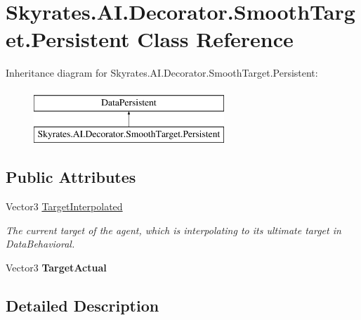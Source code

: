 \hypertarget{class_skyrates_1_1_a_i_1_1_decorator_1_1_smooth_target_1_1_persistent}{\section{Skyrates.\-A\-I.\-Decorator.\-Smooth\-Target.\-Persistent Class Reference}
\label{class_skyrates_1_1_a_i_1_1_decorator_1_1_smooth_target_1_1_persistent}
}


 


Inheritance diagram for Skyrates.\-A\-I.\-Decorator.\-Smooth\-Target.\-Persistent\-:\begin{figure}[H]
\begin{center}
\leavevmode
\includegraphics[height=2.000000cm]{class_skyrates_1_1_a_i_1_1_decorator_1_1_smooth_target_1_1_persistent}
\end{center}
\end{figure}
\subsection*{Public Attributes}
\begin{DoxyCompactItemize}
\item 
Vector3 \hyperlink{class_skyrates_1_1_a_i_1_1_decorator_1_1_smooth_target_1_1_persistent_a95095b4965ea0dd073ff586168650f6e}{Target\-Interpolated}
\begin{DoxyCompactList}\small\item\em The current target of the agent, which is interpolating to its ultimate target in Data\-Behavioral. \end{DoxyCompactList}\item 
\hypertarget{class_skyrates_1_1_a_i_1_1_decorator_1_1_smooth_target_1_1_persistent_a91d78cff4e8a9fe39b78d3ade7aea043}{Vector3 {\bfseries Target\-Actual}}\label{class_skyrates_1_1_a_i_1_1_decorator_1_1_smooth_target_1_1_persistent_a91d78cff4e8a9fe39b78d3ade7aea043}

\end{DoxyCompactItemize}


\subsection{Detailed Description}


